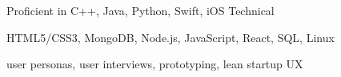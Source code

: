 

\begin{cvhonors}

  \cvhonor
    {Proficient in} %
    {C++, Java, Python, Swift, iOS} %
    {} %
    {Technical} %

  \cvhonor
    {HTML5/CSS3, MongoDB, Node.js, JavaScript, React, SQL, Linux} %
    {} %
    {} %
    {} %

  \cvhonor
  {user personas, user interviews, prototyping, lean startup} %
  {} %
  {} %
  {UX} %
  

\end{cvhonors}

